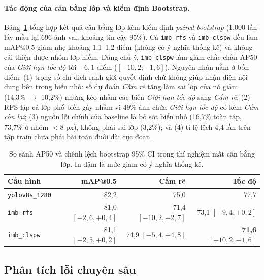 \documentclass[11pt]{article}
\begin{document}
\paragraph{Tác động của cân bằng lớp và kiểm định Bootstrap.}
Bảng~\ref{tab:imbalance} tổng hợp kết quả cân bằng lớp kèm kiểm định \textit{paired bootstrap} (1.000 lần lấy mẫu lại 696 ảnh val, khoảng tin cậy 95\%). Cả \texttt{imb\_rfs} và \texttt{imb\_clspw} đều làm mAP@0.5 giảm nhẹ khoảng 1,1--1,2 điểm (không có ý nghĩa thống kê) và không cải thiện được nhóm lớp hiếm. Đáng chú ý, \texttt{imb\_clspw} làm giảm chắc chắn AP50 của \textit{Giới hạn tốc độ} tới $-6{,}1$ điểm ($[-10{,}2; -1{,}6]$). Nguyên nhân nằm ở bốn điểm: (1) trọng số chỉ dịch ranh giới quyết định chứ không giúp nhận diện nội dung bên trong biển nhỏ: số dự đoán \textit{Cấm rẽ} tăng làm sai lớp của nó giảm (14,3\% $\to$ 10,2\%) nhưng kéo nhầm các biển \textit{Giới hạn tốc độ} sang \textit{Cấm rẽ}; (2) RFS lặp cả lớp phổ biến gây nhầm vì 49\% ảnh chứa \textit{Giới hạn tốc độ} có kèm \textit{Cấm còn lại}; (3) nguồn lỗi chính của baseline là bỏ sót biển nhỏ (16,7\% toàn tập, 73,7\% ở nhóm $<8$ px), không phải sai lớp (3,2\%); và (4) tỉ lệ lệch 4,4 lần trên tập train chưa phải bài toán đuôi dài cực đoan.

\begin{table}[t]
\centering
\small
\begin{tabular}{lrrr}
\toprule
\textbf{Cấu hình} & \textbf{mAP@0.5} & \textbf{Cấm rẽ} & \textbf{Tốc độ} \\
\midrule
\texttt{yolov8s\_1280} & 82,2 & 75,0 & 77,7 \\
\texttt{imb\_rfs} & 81,0 {\scriptsize $[-2{,}6,+0{,}4]$} & 71,4 {\scriptsize $[-10{,}2,+2{,}7]$} & 73,1 {\scriptsize $[-9{,}4,+0{,}2]$} \\
\texttt{imb\_clspw} & 81,1 {\scriptsize $[-2{,}5,+0{,}2]$} & 74,9 {\scriptsize $[-5{,}4,+4{,}8]$} & \textbf{71,6} {\scriptsize $[-10{,}2,-1{,}6]$} \\
\bottomrule
\end{tabular}
\caption{So sánh AP50 và chênh lệch bootstrap 95\% CI trong thí nghiệm mất cân bằng lớp. In đậm là mức giảm có ý nghĩa thống kê.}
\label{tab:imbalance}
\end{table}

\subsection{Phân tích lỗi chuyên sâu}
\end{document}
